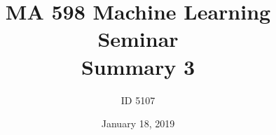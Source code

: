 \documentclass[10pt,letterpaper]{article}
\def\IDCode{5107}
\def\Title{MA 598}
\def\HomeworkNumber{3}
\def\DueBy{January 18, 2019}
\numberwithin{problem}{section}
\numberwithin{equation}{section}
\begin{document}
\title{\Title{} Machine Learning Seminar \\ Summary \HomeworkNumber{}}%
\author{ID \IDCode{}}%
\date{\DueBy{}}%
\maketitle


\end{document}
